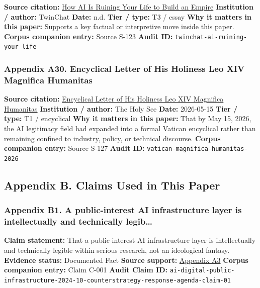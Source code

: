 \documentclass[
  american,
  11pt,
  letterpaper,
]{article}
\begin{document}
\textbf{Source citation:}
\href{https://medium.com/twinchat/how-ai-is-ruining-your-life-to-build-an-empire-8b6d02e55bc9}{How
AI Is Ruining Your Life to Build an Empire} \textbf{Institution /
author:} TwinChat \textbf{Date:} n.d. \textbf{Tier / type:} T3 / essay
\textbf{Why it matters in this paper:} Supports a key factual or
interpretive move inside this paper. \textbf{Corpus companion entry:}
Source S-123 \textbf{Audit ID:} \texttt{twinchat-ai-ruining-your-life}

\subsubsection{Appendix A30. Encyclical Letter of His Holiness Leo XIV
Magnifica
Humanitas}\label{appendix-a30-encyclical-letter-of-his-holiness-leo-xiv-magnifica-humanitas}

\textbf{Source citation:}
\href{https://www.vatican.va/content/leo-xiv/en/encyclicals/documents/20260515-magnifica-humanitas.html}{Encyclical
Letter of His Holiness Leo XIV Magnifica Humanitas} \textbf{Institution
/ author:} The Holy See \textbf{Date:} 2026-05-15 \textbf{Tier / type:}
T1 / encyclical \textbf{Why it matters in this paper:} That by May 15,
2026, the AI legitimacy field had expanded into a formal Vatican
encyclical rather than remaining confined to industry, policy, or
technical discourse. \textbf{Corpus companion entry:} Source S-127
\textbf{Audit ID:} \texttt{vatican-magnifica-humanitas-2026}

\subsection{Appendix B. Claims Used in This
Paper}\label{appendix-b.-claims-used-in-this-paper}

\subsubsection{Appendix B1. A public-interest AI infrastructure layer is
intellectually and technically
legib\ldots{}}\label{appendix-b1-a-public-interest-ai-infrastructure-layer-is-intellectually-and-technically-legib}

\textbf{Claim statement:} That a public-interest AI infrastructure layer
is intellectually and technically legible within serious research, not
an ideological fantasy. \textbf{Evidence status:} Documented Fact
\textbf{Source support:}
\hyperref[appendix-a3-interactions-between-artificial-intelligence-and-digital-public-infrastructure-concepts-benefits-and-challenges]{Appendix
A3} \textbf{Corpus companion entry:} Claim C-001 \textbf{Audit Claim
ID:}
\texttt{ai-digital-public-infrastructure-2024-10-counterstrategy-response-agenda-claim-01}
\end{document}
